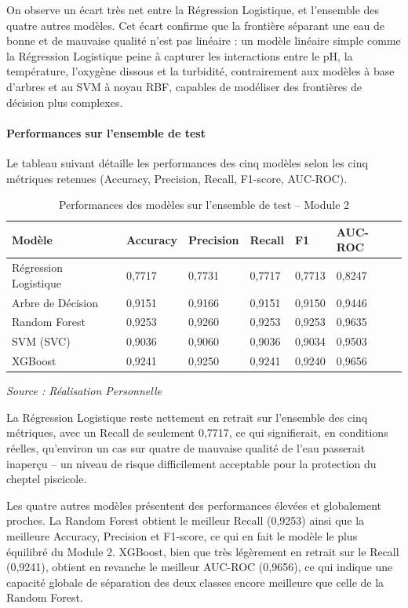 \documentclass[a4paper,12pt, oneside]{article}
\begin{document}
On observe un écart très net entre la Régression Logistique, et l'ensemble des quatre autres modèles. Cet écart confirme que la frontière séparant une eau de bonne et de mauvaise qualité n'est pas linéaire : un modèle linéaire simple comme la Régression Logistique peine à capturer les interactions entre le pH, la température, l'oxygène dissous et la turbidité, contrairement aux modèles à base d'arbres et au SVM à noyau RBF, capables de modéliser des frontières de décision plus complexes.

\paragraph{Performances sur l'ensemble de test\\}
Le tableau suivant détaille les performances des cinq modèles selon les cinq métriques retenues (Accuracy, Precision, Recall, F1-score, AUC-ROC).

\begin{table}[H]
\centering
\begin{tabular}{|p{3.5cm}|p{1.9cm}|p{1.9cm}|p{1.9cm}|p{1.5cm}|p{1.9cm}|}
\hline
\textbf{Modèle} & \textbf{Accuracy} & \textbf{Precision} & \textbf{Recall} & \textbf{F1} & \textbf{AUC-ROC} \\
\hline
Régression Logistique & 0,7717 & 0,7731 & 0,7717 & 0,7713 & 0,8247 \\
\hline
Arbre de Décision & 0,9151 & 0,9166 & 0,9151 & 0,9150 & 0,9446 \\
\hline
Random Forest & 0,9253 & 0,9260 & 0,9253 & 0,9253 & 0,9635 \\
\hline
SVM (SVC) & 0,9036 & 0,9060 & 0,9036 & 0,9034 & 0,9503 \\
\hline
XGBoost & 0,9241 & 0,9250 & 0,9241 & 0,9240 & 0,9656 \\
\hline
\end{tabular}
\caption{Performances des modèles sur l'ensemble de test -- Module 2}
\textit{Source : Réalisation Personnelle}
\end{table}


La Régression Logistique reste nettement en retrait sur l'ensemble des cinq métriques, avec un Recall de seulement 0,7717, ce qui signifierait, en conditions réelles, qu'environ un cas sur quatre de mauvaise qualité de l'eau passerait inaperçu -- un niveau de risque difficilement acceptable pour la protection du cheptel piscicole.

Les quatre autres modèles présentent des performances élevées et globalement proches. La Random Forest obtient le meilleur Recall (0,9253) ainsi que la meilleure Accuracy, Precision et F1-score, ce qui en fait le modèle le plus équilibré du Module 2. XGBoost, bien que très légèrement en retrait sur le Recall (0,9241), obtient en revanche le meilleur AUC-ROC (0,9656), ce qui indique une capacité globale de séparation des deux classes encore meilleure que celle de la Random Forest.
\end{document}

